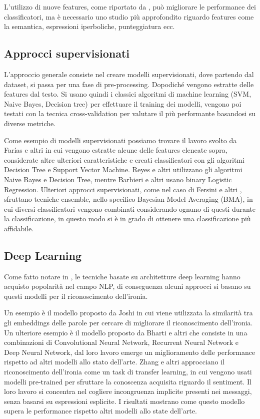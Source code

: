 \documentclass[oneside]{book}
\begin{document}
L'utilizzo di nuove features, come riportato da \cite{survey1}, può migliorare le performance dei classificatori, ma  è necessario uno studio più approfondito riguardo features come la semantica, espressioni iperboliche, punteggiatura ecc. 



\subsection{Approcci supervisionati}
L'approccio generale consiste nel creare modelli supervisionati, dove partendo dal dataset, si passa per una fase di pre-processing. Dopodiché vengono estratte delle features dal testo. Si usano quindi i classici algoritmi di machine learning (SVM, Naive Bayes, Decision tree) per effettuare il training dei modelli, vengono poi testati con la tecnica cross-validation per valutare il più performante basandosi su diverse metriche.

Come esempio di modelli supervisionati possiamo trovare il lavoro svolto da Farías e altri \cite{farias} in cui vengono estratte alcune delle features elencate sopra, considerate altre ulteriori caratteristiche e creati classificatori con gli algoritmi Decision Tree e Support Vector Machine. Reyes e altri \cite{reyes} utilizzano gli algoritmi Naive Bayes e Decision Tree, mentre Barbieri e altri \cite{sarcasm-ita} usano binary Logistic Regression.
Ulteriori approcci supervisionati, come nel caso di Fersini e altri \cite{fersini}, sfruttano tecniche ensemble, nello specifico Bayesian Model Averaging (BMA), in cui diversi classificatori vengono combinati considerando ognuno di questi durante la classificazione, in questo modo si è in grado di ottenere una classificazione più affidabile.



\subsection{Deep Learning}
Come fatto notare in \cite{survey5}, le tecniche basate su architetture deep learning hanno acquisto popolarità nel campo NLP, di conseguenza alcuni approcci si basano su questi modelli per il riconoscimento dell'ironia.

Un esempio è il modello proposto da Joshi \cite{embeddings} in cui viene utilizzata la similarità tra gli embeddings delle parole per cercare di migliorare il riconoscimento dell'ironia. Un ulteriore esempio è il modello proposto da Bharti e altri \cite{deep-learning} che consiste in una combinazioni di Convolutional Neural Network, Recurrent Neural Network e Deep Neural Network, dal loro lavoro emerge un miglioramento delle performance rispetto ad altri modelli allo stato dell'arte. Zhang e altri \cite{zang} approcciano il riconoscimento dell'ironia come un task di transfer learning, in cui vengono usati modelli pre-trained per sfruttare la conoscenza acquisita riguardo il sentiment. Il loro lavoro si concentra nel cogliere incongruenza implicite presenti nei messaggi, senza basarsi su espressioni esplicite. I risultati mostrano come questo modello supera le performance rispetto altri modelli allo state dell'arte.
\end{document}
